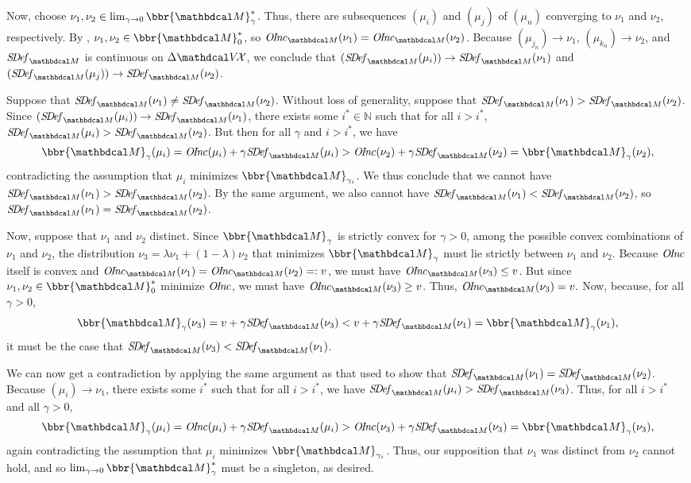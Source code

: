 \begin{subappendices}
\begin{lproof}
Now, choose $\nu_1, \nu_2  \in  \lim_{\gamma\to0}\bbr{\dg
  M}_\gamma^*$. 
Thus, there are subsequences $(\mu_{i})$ and $(\mu_{j})$ of
$(\mu_n)$ converging
to $\nu_1$ and $\nu_2$, respectively.
By , $\nu_1, \nu_2 \in \bbr{\dg M}_0^*$, so
$\OInc_{\dg M}(\nu_1) = \OInc_{\dg M}(\nu_2)$.  
Because  $(\mu_{j_n}) \to \nu_1$, $(\mu_{k_n}) \to \nu_2$, and
$\SDef_{\dg M}$ is
continuous on $\Delta\V\!\X$,
we conclude that  
$(\SDef_{\dg M}(\mu_{i}))\to \SDef_{\dg M}(\nu_1)$ and
$(\SDef_{\dg M}(\mu_{j}))\to \SDef_{\dg M}(\nu_2)$.

Suppose that $\SDef_{\dg
M}(\nu_1) \neq \SDef_{\dg M}(\nu_2)$. Without loss of generality,
suppose that $\SDef_{\dg M}(\nu_1) > \SDef_{\dg M}(\nu_2)$. 
Since $(\SDef_{\dg M}(\mu_{i})) \to \SDef_{\dg M}(\nu_1)$, there exists some $i^*
\in \mathbb N$ such that for all $i > i^*$,  
$ \SDef_{\dg M}(\mu_{i}) >  \SDef_{\dg M}(\nu_2) $.
But then for all $\gamma$ and $i > i^*$, we have 
\[ \bbr{\dg M}_\gamma(\mu_i) = \OInc(\mu_i) + \gamma\SDef_{\dg M}(\mu_i)
> \OInc(\nu_2)  
+ \gamma \SDef_{\dg M}(\nu_2) = \bbr{\dg M}_\gamma(\nu_2),\]
contradicting the assumption that $\mu_{i}$ minimizes
$\bbr{\dg M}_{\gamma_{i}}$. We thus conclude that we
cannot have $\SDef_{\dg M}(\nu_1) > \SDef_{\dg M}(\nu_2)$.  By the same
argument, we also cannot have $\SDef_{\dg M}(\nu_1) < \SDef_{\dg
  M}(\nu_2)$, so $\SDef_{\dg M}(\nu_1) =\SDef_{\dg M}(\nu_2)$.  
  
Now, suppose that $\nu_1$ and $\nu_2$ distinct. Since $\bbr{\dg M}_\gamma$
is strictly convex for $\gamma > 0$, among the possible convex
combinations of $\nu_1$ and $\nu_2$, the distribution $\nu_3 = \lambda
\nu_1 + (1-\lambda) \nu_2$ that minimizes $\bbr{\dg M}_\gamma$ must
lie strictly between $\nu_1$ and $\nu_2$. 
Because $\mathit{O\mskip-2.5muI\mskip-3.5mun\mskip-1.7muc}$ itself is convex and $\OInc_{\dg M}(\nu_1) = \OInc_{\dg
  M}(\nu_2) =: v$, we must have $\OInc_{\dg M}(\nu_3) \le v$. 
But since
$\nu_1,\nu_2 \in \bbr{\dg M}_0^*$ minimize $\mathit{O\mskip-2.5muI\mskip-3.5mun\mskip-1.7muc}$,
we must have $\OInc_{\dg M}(\nu_3) \ge v$.
Thus, $\OInc_{\dg M}(\nu_3) = v$. 
Now, because, for all  $\gamma > 0$,
\[ \bbr{\dg M}_\gamma(\nu_3) = v + \gamma \SDef_{\dg M}(\nu_3) 
 	< v + \gamma \SDef_{\dg M}(\nu_1) = \bbr{\dg M}_\gamma(\nu_1), \] 
it must be the case that $\SDef_{\dg M}(\nu_3) < \SDef_{\dg M}(\nu_1)$. 
        
We can now get a contradiction by applying the same argument as that used to show
that $\SDef_{\dg M}(\nu_1) =\SDef_{\dg M}(\nu_2)$.  
    Because $(\mu_{i}) \to \nu_1$, there exists some
    $i^*$ such that for all $i > i^*$, we have $\SDef_{\dg M}(\mu_{i}) >
    \SDef_{\dg M}(\nu_3)$. Thus, for all $i > i^*$ and all
    $\gamma > 0$, 
    \[ \bbr{\dg M}_\gamma(\mu_{i}) = \OInc(\mu_{i}) + \gamma\SDef_{\dg M}(\mu_{i}) > \OInc(\nu_3) 
    + \gamma \SDef_{\dg M}(\nu_3) = \bbr{\dg M}_\gamma(\nu_3),\]
again contradicting the assumption that $\mu_{i}$ minimizes
$\bbr{\dg M}_{\gamma_{i}}$.
Thus, our supposition that $\nu_1$ was distinct from $\nu_2$ cannot hold, and so
$\lim_{\gamma \to 0}\bbr{\dg M}_\gamma^*$ must be a singleton, as desired.
\end{lproof}


\end{subappendices}
